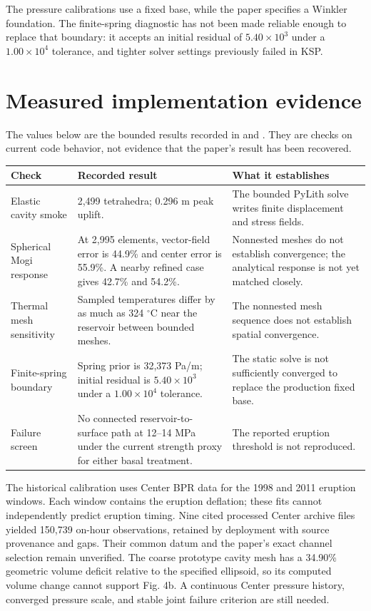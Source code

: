\documentclass[10pt]{article}
\newcommand{\p}[1]{\path{#1}}
\begin{document}
The pressure calibrations use a fixed base, while the paper specifies a
Winkler foundation. The finite-spring diagnostic has not been made reliable
enough to replace that boundary: it accepts an initial residual of
$5.40\times10^3$ under a $1.00\times10^4$ tolerance, and tighter solver
settings previously failed in KSP.

\clearpage
\section*{Measured implementation evidence}
The values below are the bounded results recorded in \p{docs/run_log.md} and
\p{docs/KNOWN_ISSUES.md}. They are checks on current code behavior, not evidence
that the paper's result has been recovered.

\small
\begin{tabularx}{\textwidth}{@{}p{}p{}X@{}}
\toprule
Check & Recorded result & What it establishes \\
\midrule
Elastic cavity smoke & 2,499 tetrahedra; 0.296 m peak uplift. & The bounded PyLith solve writes finite displacement and stress fields. \\
Spherical Mogi response & At 2,995 elements, vector-field error is 44.9\% and center error is 55.9\%. A nearby refined case gives 42.7\% and 54.2\%. & Nonnested meshes do not establish convergence; the analytical response is not yet matched closely. \\
Thermal mesh sensitivity & Sampled temperatures differ by as much as 324 $^\circ$C near the reservoir between bounded meshes. & The nonnested mesh sequence does not establish spatial convergence. \\
Finite-spring boundary & Spring prior is 32,373 Pa/m; initial residual is $5.40\times10^3$ under a $1.00\times10^4$ tolerance. & The static solve is not sufficiently converged to replace the production fixed base. \\
Failure screen & No connected reservoir-to-surface path at 12--14 MPa under the current strength proxy for either basal treatment. & The reported eruption threshold is not reproduced. \\
\bottomrule
\end{tabularx}
\normalsize

The historical calibration uses Center BPR data for the 1998 and 2011
eruption windows. Each window contains the eruption deflation; these fits
cannot independently predict eruption timing. Nine cited processed Center
archive files yielded 150,739 on-hour observations, retained by deployment
with source provenance and gaps. Their common datum and the paper's
exact channel selection remain unverified. The coarse prototype cavity mesh
has a 34.90\% geometric volume deficit relative to the specified ellipsoid,
so its computed volume change cannot support Fig. 4b. A continuous Center
pressure history, converged pressure scale, and stable joint failure
criterion are still needed.
\end{document}
